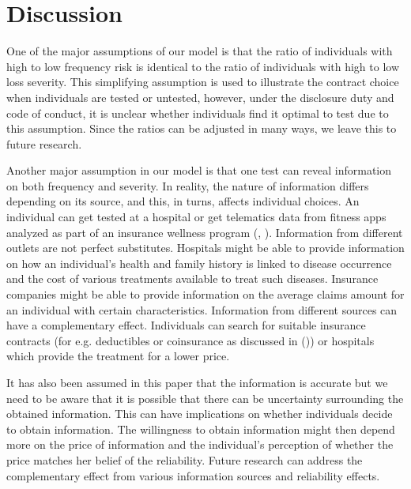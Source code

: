 \documentclass[nonatbib,preprint,12pt]{elsarticle}
\theoremstyle{plain}
\theoremstyle{definition}
\theoremstyle{plain}
\theoremstyle{TheoremNum}
\theoremstyle{CorollaryNum}
\theoremstyle{PropositionNum}
\theoremstyle{TheoremNum}
\begin{document}
\section{Discussion}

One of the major assumptions of our model is that the ratio of individuals with high to low frequency risk is identical to the ratio of individuals with high to low loss severity. This simplifying assumption is used to illustrate the contract choice when individuals are tested or untested, however, under the disclosure duty and code of conduct, it is unclear whether individuals find it optimal to test due to this assumption. Since the ratios can be adjusted in many ways, we leave this to future research.

Another major assumption in our model is that one test can reveal information on both frequency and severity. In reality, the nature of information differs depending on its source, and this, in turns, affects individual choices. An individual can get tested at a hospital or get telematics data from fitness apps analyzed as part of an insurance wellness program (\citeauthor{aziz2019machine}, \citeyear{aziz2019machine}). Information from different outlets are not perfect substitutes. Hospitals might be able to provide information on how an individual's health and family history is linked to disease occurrence and the cost of various treatments available to treat such diseases. Insurance companies might be able to provide information on the average claims amount for an individual with certain characteristics. Information from different sources can have a complementary effect. Individuals can search for suitable insurance contracts (for e.g. deductibles or coinsurance as discussed in \citeauthor{ligon2008adverse} (\citeyear{ligon2008adverse})) or hospitals which provide the treatment for a lower price.

It has also been assumed in this paper that the information is accurate but we need to be aware that it is possible that there can be uncertainty surrounding the obtained information. This can have implications on whether individuals decide to obtain information. The willingness to obtain information might then depend more on the price of information and the individual's perception of whether the price matches her belief of the reliability. Future research can address the complementary effect from various information sources and reliability effects.
\end{document}
